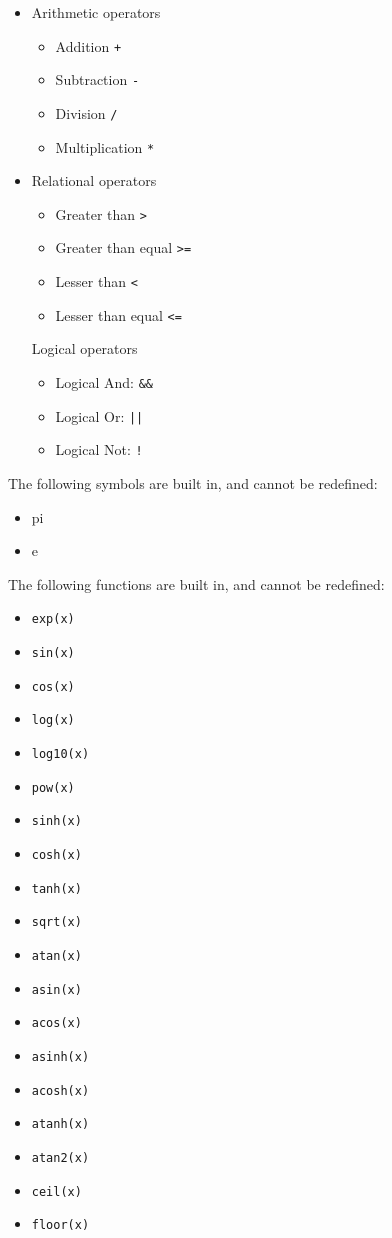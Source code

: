 \documentclass{article}
\begin{document}
\begin{itemize}
\item Arithmetic operators
\begin{itemize}
\item Addition \verb|+|
\item Subtraction \verb|-|
\item Division \verb|/|
\item Multiplication \verb|*|
\end{itemize}

\item Relational operators
\begin{itemize}
\item Greater than \verb|>|
\item Greater than equal \verb|>=|
\item Lesser than \verb|<|
\item Lesser than equal \verb|<=|
\end{itemize}

Logical operators
\begin{itemize}
\item Logical And: \verb|&&|
\item Logical Or:  \verb+||+
\item Logical Not: \verb|!|
\end{itemize}

\end{itemize}

The following symbols are built in, and cannot be redefined:
\begin{itemize}
\item pi
\item e
\end{itemize}


The following functions are built in, and cannot be redefined:
\begin{itemize}
\item \verb|exp(x)|
\item \verb|sin(x)|
\item \verb|cos(x)|
\item \verb|log(x)|
\item \verb|log10(x)|
\item \verb|pow(x)|
\item \verb|sinh(x)|
\item \verb|cosh(x)|
\item \verb|tanh(x)|
\item \verb|sqrt(x)|
\item \verb|atan(x)|
\item \verb|asin(x)|
\item \verb|acos(x)|
\item \verb|asinh(x)|
\item \verb|acosh(x)|
\item \verb|atanh(x)|
\item \verb|atan2(x)|
\item \verb|ceil(x)|
\item \verb|floor(x)|
\end{itemize}
\end{document}
